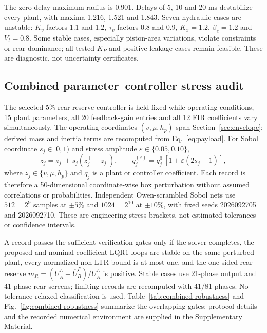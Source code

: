 \documentclass[fleqn,final,5p,times]{elsarticle}
\begin{document}
{The zero-delay maximum radius is 0.901. Delays of 5, 10 and 20 ms destabilize every plant, with maxima 1.216, 1.521 and 1.843. Seven hydraulic cases are unstable: $K_v$ factors 1.1 and 1.2, $\tau_v$ factors 0.8 and 0.9, $K_x=1.2$, $\beta_e=1.2$ and $V_t=0.8$. Some stable cases, especially piston-area variations, violate constraints or rear dominance; all tested $K_P$ and positive-leakage cases remain feasible. These are diagnostic, not uncertainty certificates.}

\subsection{Combined parameter--controller stress audit}

The selected 5\% rear-reserve controller is held fixed while operating conditions, 15 plant parameters, all 20 feedback-gain entries and all 12 FIR coefficients vary simultaneously. The operating coordinates $(v,\mu,h_p)$ span Section~\ref{sec:envelope}; derived mass and inertia terms are recomputed from Eq.~\eqref{eq:payload}. For Sobol coordinate $s_j\in[0,1)$ and stress amplitude $\varepsilon\in\{0.05,0.10\}$,
\begin{equation}
z_j=z_j^-+s_j(z_j^+-z_j^-),\qquad
q_j^{(\varepsilon)}=q_j^0\,[1+\varepsilon(2s_j-1)],
\label{eq:combined-uncertainty}
\end{equation}
where $z_j\in\{v,\mu,h_p\}$ and $q_j$ is a plant or controller coefficient. Each record is therefore a 50-dimensional coordinate-wise box perturbation without assumed correlations or probabilities. Independent Owen-scrambled Sobol nets \cite{sobol1967,owen1998} use $512=2^9$ samples at $\pm5\%$ and $1024=2^{10}$ at $\pm10\%$, with fixed seeds 2026092705 and 2026092710. These are engineering stress brackets, not estimated tolerances or confidence intervals.

A record passes the sufficient verification gates only if the solver completes, the proposed and nominal-coefficient LQR1 loops are stable on the same perturbed plant, every normalized non-LTR bound is at most one, and the one-sided rear reserve $m_R=(\underline U_R^{L}-\overline U_R^{P})/\underline U_R^{L}$ is positive. Stable cases use 21-phase output and 41-phase rear screens; limiting records are recomputed with 41/81 phases. No tolerance-relaxed classification is used. Table~\ref{tab:combined-robustness} and Fig.~\ref{fig:combined-robustness} summarize the overlapping gates; protocol details and the recorded numerical environment are supplied in the Supplementary Material.
\end{document}
